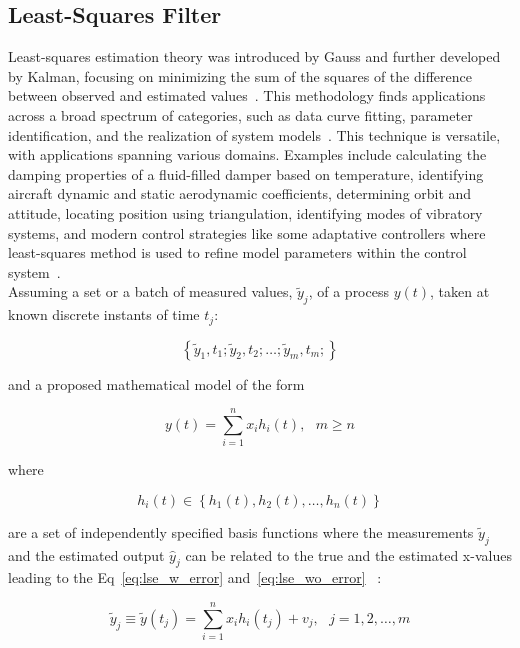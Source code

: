 \subsection{Least-Squares Filter}
Least-squares estimation theory was introduced by Gauss and further developed by Kalman, focusing on minimizing the sum of the squares of the difference between observed and estimated values~\cite{sorenson1970lse}. This methodology finds applications across a broad spectrum of categories, such as data curve fitting, parameter identification, and the realization of system models~\cite{crassidis2004dynamic}. This technique is versatile, with applications spanning various domains. Examples include calculating the damping properties of a fluid-filled damper based on temperature, identifying aircraft dynamic and static aerodynamic coefficients, determining orbit and attitude, locating position using triangulation, identifying modes of vibratory systems, and modern control strategies like some adaptative controllers where least-squares method is used to refine model parameters within the control system~\cite{crassidis2004dynamic}. \\

Assuming a set or a batch of measured values, $\tilde{y}_{j}$, of a process $y(t)$, taken at known discrete instants of time $t_{j}$:

\begin{equation}
    \left\{\tilde{y}_{1}, t_{1}; \tilde{y}_{2}, t_{2}; \ldots; \tilde{y}_{m}, t_{m}; \right\}
\end{equation}

and a proposed mathematical model of the form

\begin{equation}
    y(t) = \sum_{i = 1}^{n}{x_{i} h_{i}(t)},~~~m \geq n
\end{equation}

where

\begin{equation}
    h_{i}(t) \in \left\{ h_{1}(t), h_{2}(t), \ldots, h_{n}(t) \right\}
\end{equation}

are a set of independently specified basis functions where the measurements $\tilde{y}_{j}$ and the estimated output $\hat{y}_{j}$ can be related to the true and the estimated x-values leading to the Eq~\ref{eq:lse_w_error} and~\ref{eq:lse_wo_error} ~\cite{crassidis2004dynamic}:

\begin{equation}
    \tilde{y}_{j} \equiv \tilde{y}(t_{j}) = \sum_{i = 1}^{n}{x_{i} h_{i}(t_{j}) + v_{j}},~~~j = 1, 2, \ldots, m
    \label{eq:lse_w_error}
\end{equation}

